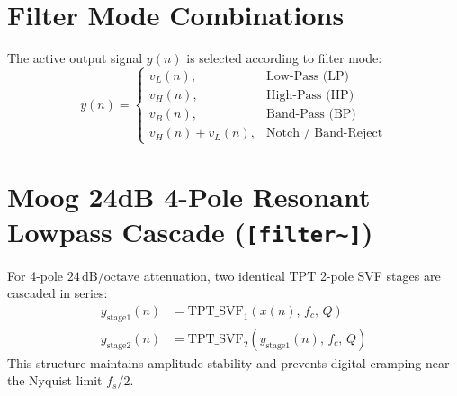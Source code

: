 \documentclass[11pt,a4paper]{article}
\begin{document}
\section{Filter Mode Combinations}
The active output signal $y(n)$ is selected according to filter mode:
\begin{equation}
y(n) =
\begin{cases}
v_L(n), & \text{Low-Pass (LP)} \\
v_H(n), & \text{High-Pass (HP)} \\
v_B(n), & \text{Band-Pass (BP)} \\
v_H(n) + v_L(n), & \text{Notch / Band-Reject}
\end{cases}
\end{equation}

\section{Moog 24dB 4-Pole Resonant Lowpass Cascade (\texttt{[filter\textasciitilde{}]})}
For 4-pole $24\,\text{dB/octave}$ attenuation, two identical TPT 2-pole SVF stages are cascaded in series:
\begin{align}
y_{\text{stage1}}(n) &= \text{TPT\_SVF}_1\left(x(n), \, f_c, \, Q\right) \\
y_{\text{stage2}}(n) &= \text{TPT\_SVF}_2\left(y_{\text{stage1}}(n), \, f_c, \, Q\right)
\end{align}
This structure maintains amplitude stability and prevents digital cramping near the Nyquist limit $f_s / 2$.
\end{document}

